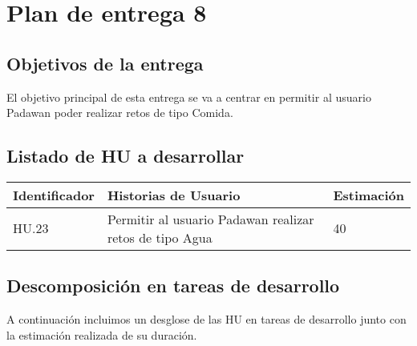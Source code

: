 \section{Plan de entrega 8}

\subsection{Objetivos de la entrega}

El objetivo principal de esta entrega se va a centrar en permitir al usuario Padawan poder realizar retos de tipo Comida.

\subsection{Listado de HU a desarrollar}

\begin{table}[h]
	\centering
	\begin{tabular}{| p{2.3cm} | p{6.7cm} | p{2cm} |}
		\rowcolor[HTML]{329A9D} 
		{\color[HTML]{FFFFFF} \textbf{Identificador}} & {\color[HTML]{FFFFFF} \textbf{Historias de Usuario}} & {\color[HTML]{FFFFFF} \textbf{Estimación}}  \\ \hline
		HU.23 & Permitir al usuario Padawan realizar retos de tipo Agua & 40 \\ \hline
	\end{tabular}
\end{table}

\newpage

\subsection{Descomposición en tareas de desarrollo}

A continuación incluimos un desglose de las HU en tareas de desarrollo junto con la estimación realizada de su duración.\\

